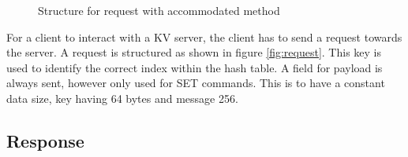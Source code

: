 \begin{figure}
    \centering
    \caption{Structure for request with accommodated method}
\end{figure}

For a client to interact with a KV server, the client has to send a request towards the server.
A request is structured as shown in figure \ref{fig:request}.
This key is used to identify the correct index within the hash table.
A field for payload is always sent, however only used for SET commands.
This is to have a constant data size, key having 64 bytes and message 256.

\subsection{Response}

